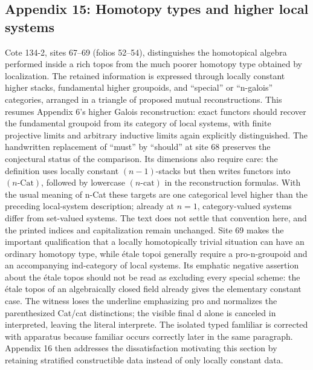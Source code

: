 \documentclass[10pt,oneside]{book}
\begin{document}
\subsection*{Appendix 15: Homotopy types and higher local systems}
Cote 134-2, sites 67--69 (folios 52--54), distinguishes the homotopical algebra performed inside a rich topos from the much poorer homotopy type obtained by localization. The retained information is expressed through locally constant higher stacks, fundamental higher groupoids, and ``special'' or ``n-galois'' categories, arranged in a triangle of proposed mutual reconstructions. This resumes Appendix 6's higher Galois reconstruction: exact functors should recover the fundamental groupoid from its category of local systems, with finite projective limits and arbitrary inductive limits again explicitly distinguished. The handwritten replacement of ``must'' by ``should'' at site 68 preserves the conjectural status of the comparison. Its dimensions also require care: the definition uses locally constant $(n-1)$-stacks but then writes functors into $(n\text{-}\mathrm{Cat})$, followed by lowercase $(n\text{-}\mathrm{cat})$ in the reconstruction formulas. With the usual meaning of n-Cat these targets are one categorical level higher than the preceding local-system description; already at $n=1$, category-valued systems differ from set-valued systems. The text does not settle that convention here, and the printed indices and capitalization remain unchanged. Site 69 makes the important qualification that a locally homotopically trivial situation can have an ordinary homotopy type, while étale topoi generally require a pro-n-groupoid and an accompanying ind-category of local systems. Its emphatic negative assertion about the étale topos should not be read as excluding every special scheme: the étale topos of an algebraically closed field already gives the elementary constant case. The witness loses the underline emphasizing pro and normalizes the parenthesized Cat/cat distinctions; the visible final d alone is canceled in interpreted, leaving the literal interprete. The isolated typed famliliar is corrected with apparatus because familiar occurs correctly later in the same paragraph. Appendix 16 then addresses the dissatisfaction motivating this section by retaining stratified constructible data instead of only locally constant data.
\end{document}
